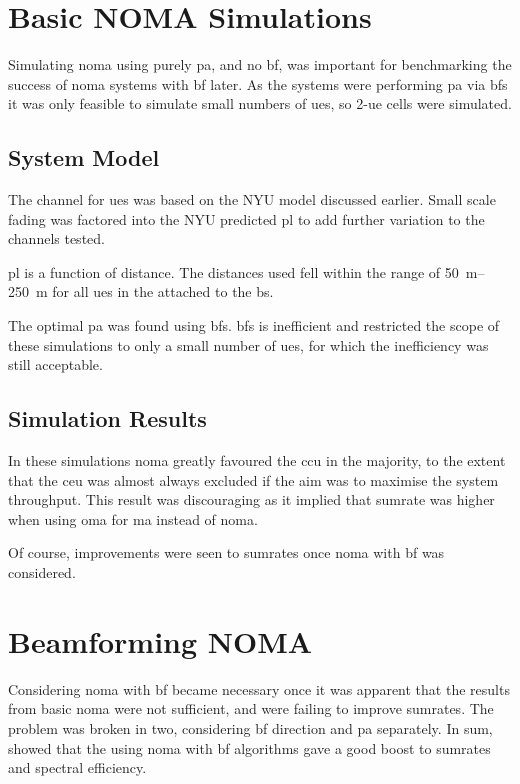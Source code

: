 \section{Basic NOMA Simulations}
Simulating \ac{noma} using purely \ac{pa}, and no \ac{bf}, was important for benchmarking the success of \ac{noma} systems with \ac{bf} later.
As the systems were performing \ac{pa} via \ac{bfs} it was only feasible to simulate small numbers of \acp{ue}, so 2-\ac{ue} cells were simulated.

\subsection{System Model}
The channel for \acp{ue} was based on the NYU model discussed earlier.
Small scale fading was factored into the NYU predicted \ac{pl} to add further variation to the channels tested.

\par
\ac{pl} is a function of distance.
The distances used fell within the range of \SIrange{50}{250}{\metre} for all \acp{ue} in the attached to the \ac{bs}.

\par
The optimal \ac{pa} was found using \ac{bfs}.
\ac{bfs} is inefficient and restricted the scope of these simulations to only a small number of \acp{ue}, for which the inefficiency was still acceptable.

\subsection{Simulation Results}
In these simulations \ac{noma} greatly favoured the \ac{ccu} in the majority, to the extent that the \ac{ceu} was almost always excluded if the aim was to maximise the system throughput.
This result was discouraging as it implied that sumrate was higher when using \ac{oma} for \ac{ma} instead of \ac{noma}.

\par
Of course, improvements were seen to sumrates once \ac{noma} with \ac{bf} was considered.

\section{Beamforming NOMA}
Considering \ac{noma} with \ac{bf} became necessary once it was apparent that the results from basic \ac{noma} were not sufficient, and were failing to improve sumrates.
The problem was broken in two, considering \ac{bf} direction and \ac{pa} separately.
In sum,  showed that the using \ac{noma} with \ac{bf} algorithms gave a good boost to sumrates and spectral efficiency.

